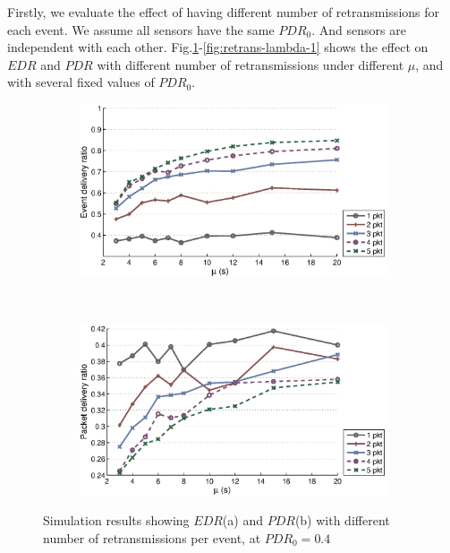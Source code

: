 Firstly, we evaluate the effect of having different number of retransmissions for each event. We assume all sensors have the same $PDR_0$. And sensors are independent with each other. Fig.\ref{fig:retrans-lambda-0.4}-\ref{fig:retrans-lambda-1} shows the effect on $EDR$ and $PDR$ with different number of retransmissions under different $\mu$, and with several fixed values of $PDR_0$. 

\begin{figure}[p]
    \centering
    \begin{subfigure}[t]{0.9\textwidth}
        \centering
        \includegraphics[width=\textwidth] {../../sw/pc/matlab/simulation-result/retrans-count-edr-250evt-pdr0.4.eps}
        \caption{}
    \end{subfigure} 
    \\
    \begin{subfigure}[t]{0.9\textwidth}
        \centering
        \includegraphics[width=\textwidth] {../../sw/pc/matlab/simulation-result/retrans-count-pdr-250evt-pdr0.4.eps}
        \caption{}
    \end{subfigure}
    \caption[$EDR$ and $PDR$ with different transmission redundancy, $PDR_0 = 0.4$]{Simulation results showing $EDR$(a) and $PDR$(b) with different number of retransmissions per event, at $PDR_0 = 0.4$}\label{fig:retrans-lambda-0.4}
\end{figure}


